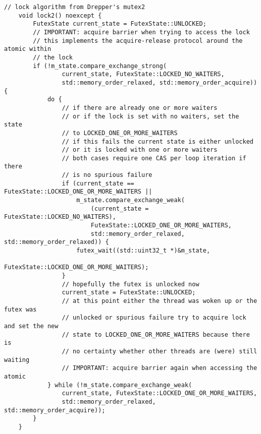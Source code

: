 \begin{lstlisting}[caption={Drepper's "mutex2/mutex3" in C++},label=append_futex]
    // lock algorithm from Drepper's mutex2
    void lock2() noexcept {
        FutexState current_state = FutexState::UNLOCKED;
        // IMPORTANT: acquire barrier when trying to access the lock
        // this implements the acquire-release protocol around the atomic within
        // the lock
        if (!m_state.compare_exchange_strong(
                current_state, FutexState::LOCKED_NO_WAITERS,
                std::memory_order_relaxed, std::memory_order_acquire)) {
            do {
                // if there are already one or more waiters
                // or if the lock is set with no waiters, set the state
                // to LOCKED_ONE_OR_MORE_WAITERS
                // if this fails the current state is either unlocked
                // or it is locked with one or more waiters
                // both cases require one CAS per loop iteration if there
                // is no spurious failure
                if (current_state == FutexState::LOCKED_ONE_OR_MORE_WAITERS ||
                    m_state.compare_exchange_weak(
                        (current_state = FutexState::LOCKED_NO_WAITERS),
                        FutexState::LOCKED_ONE_OR_MORE_WAITERS,
                        std::memory_order_relaxed, std::memory_order_relaxed)) {
                    futex_wait((std::uint32_t *)&m_state,
                                FutexState::LOCKED_ONE_OR_MORE_WAITERS);
                }
                // hopefully the futex is unlocked now
                current_state = FutexState::UNLOCKED;
                // at this point either the thread was woken up or the futex was
                // unlocked or spurious failure try to acquire lock and set the new
                // state to LOCKED_ONE_OR_MORE_WAITERS because there is
                // no certainty whether other threads are (were) still waiting
                // IMPORTANT: acquire barrier again when accessing the atomic
            } while (!m_state.compare_exchange_weak(
                current_state, FutexState::LOCKED_ONE_OR_MORE_WAITERS,
                std::memory_order_relaxed, std::memory_order_acquire));
        }
    }


\end{lstlisting}
